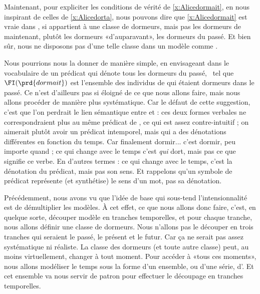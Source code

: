 Maintenant, pour expliciter les conditions de vérité de 
\ref{x:Alicedormait}, en nous inspirant de celles de
\ref{x:Alicedorta}, nous pouvons dire que \ref{x:Alicedormait} 
est vraie dans \Modele, si  appartient à
une classe de dormeurs, mais pas les dormeurs de maintenant, plutôt  les
dormeurs «d'auparavant», les dormeurs du passé.  Et bien sûr, nous ne disposons
pas d'une telle classe dans un modèle comme {\Modele}.




Nous  pourrions nous la donner de manière simple, en envisageant dans le
vocabulaire de {\LO} un prédicat
 qui dénote tous les dormeurs du passé, \ie\ tel que
$\FI(\prd{dormait})$ est l'ensemble des individus de {} qui
étaient dormeurs dans le passé.   Ce n'est d'ailleurs pas si éloigné de ce que nous
allons faire, 
mais nous allons procéder de manière plus systématique.  
Car le défaut de cette suggestion,
c'est que l'on perdrait le lien sémantique entre  et
 : ces 
deux formes verbales ne correspondraient plus au même prédicat de \LO, ce qui
est assez contre-intuitif ; on aimerait plutôt avoir un prédicat 
intemporel, mais qui a des dénotations différentes en fonction du
temps.   Car finalement dormir... c'est dormir, peu importe quand ; ce
qui change avec le temps c'est \emph{qui} dort, mais pas ce que
signifie ce verbe.  En d'autres termes : ce qui change avec le temps,
c'est la dénotation du prédicat, mais pas son sens. 
Et rappelons qu'un symbole de prédicat représente (et synthétise) le
sens d'un mot, pas sa dénotation.

Précédemment, nous avons vu que l'idée de base qui sous-tend l'intensionnalité est de démultiplier les modèles.  
À cet effet, ce que nous allons donc faire, c'est, en quelque sorte, découper  modèle en tranches
temporelles, et pour chaque 
tranche, nous allons définir une classe de dormeurs. Nous n'allons pas
le découper
en trois tranches qui seraient le passé, le présent et le futur.  Car
ça ne serait pas assez systématique ni réaliste.  
La classe des dormeurs (et toute autre classe) peut, au moins
virtuellement, changer à tout moment.   
Pour accéder à «tous ces moments»,
nous allons modéliser le temps
sous la forme d'un ensemble, ou d'une série,  d'.  
Et cet ensemble va nous servir de patron pour effectuer
le découpage en tranches temporelles.



